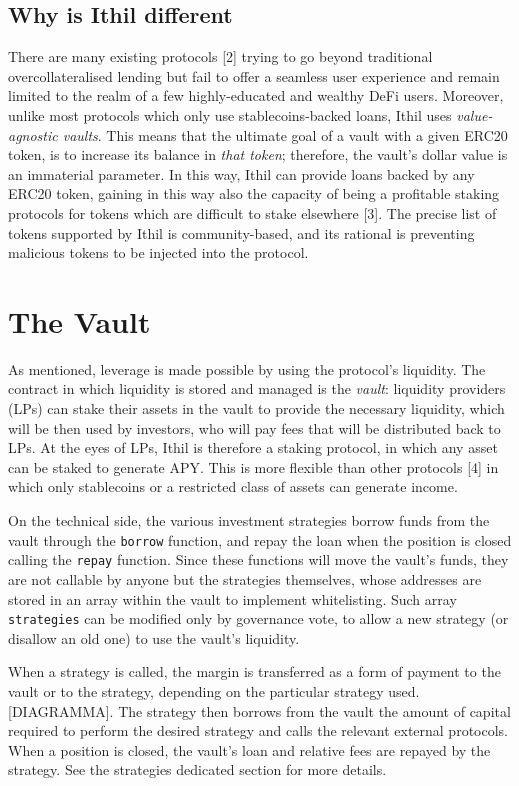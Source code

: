 \documentclass[a4paper,10 pt]{article}
\theoremstyle{definition}
\begin{document}
\subsection{Why is Ithil different}
There are many existing protocols [2] trying to go beyond traditional overcollateralised lending but fail to offer a seamless user experience and remain limited to the realm of a few highly-educated and wealthy DeFi users. Moreover, unlike most protocols which only use stablecoins-backed loans, Ithil uses {\it value-agnostic vaults}. This means that the ultimate goal of a vault with a given ERC20 token, is to increase its balance in {\it that token}; therefore, the vault's dollar value is an immaterial parameter. In this way, Ithil can provide loans backed by any ERC20 token, gaining in this way also the capacity of being a profitable staking protocols for tokens which are difficult to stake elsewhere [3]. The precise list of tokens supported by Ithil is community-based, and its rational is preventing malicious tokens to be injected into the protocol.

\section{The Vault}
As mentioned, leverage is made possible by using the protocol's liquidity. The contract in which liquidity is stored and managed is the {\it vault}: liquidity providers (LPs) can stake their assets in the vault to provide the necessary liquidity, which will be then used by investors, who will pay fees that will be distributed back to LPs. At the eyes of LPs, Ithil is therefore a staking protocol, in which any asset can be staked to generate APY. This is more flexible than other protocols [4] in which only stablecoins or a restricted class of assets can generate income.

On the technical side, the various investment strategies borrow funds from the vault through the \verb|borrow| function, and repay the loan when the position is closed calling the \verb|repay| function. Since these functions will move the vault's funds, they are not callable by anyone but the strategies themselves, whose addresses are stored in an array within the vault to implement whitelisting. Such array \verb|strategies| can be modified only by governance vote, to allow a new strategy (or disallow an old one) to use the vault's liquidity.

When a strategy is called, the margin is transferred as a form of payment to the vault or to the strategy, depending on the particular strategy used. [DIAGRAMMA]. The strategy then borrows from the vault the amount of capital required to perform the desired strategy and calls the relevant external protocols. When a position is closed, the vault's loan and relative fees are repayed by the strategy. See the strategies dedicated section for more details.
\end{document}
